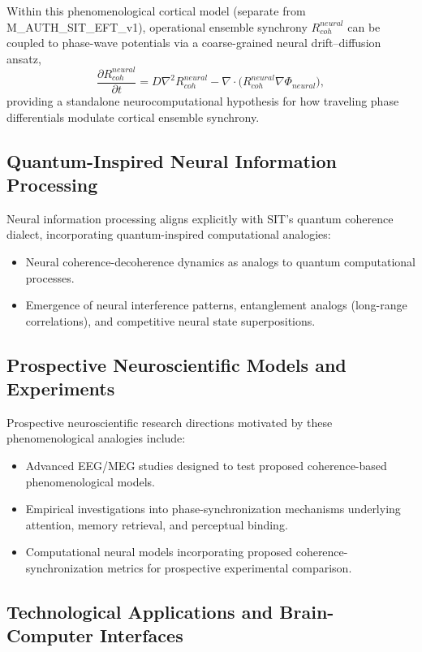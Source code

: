\documentclass[american,11pt,letterpaper]{article}
\def\mathrm#1{#1}%
\def\texttt#1{#1}%
\begin{document}
Within this phenomenological cortical model (separate from \texttt{M\_AUTH\_SIT\_EFT\_v1}), operational ensemble synchrony $R_{\mathrm{coh}}^{\mathrm{neural}}$ can be coupled to phase-wave potentials via a coarse-grained neural drift--diffusion ansatz,
\[
\frac{\partial R_{\mathrm{coh}}^{\mathrm{neural}}}{\partial t} = D \nabla^2 R_{\mathrm{coh}}^{\mathrm{neural}} - \nabla \cdot \bigl(R_{\mathrm{coh}}^{\mathrm{neural}} \nabla \Phi_{\mathrm{neural}}\bigr),
\]
providing a standalone neurocomputational hypothesis for how traveling phase differentials modulate cortical ensemble synchrony.

\subsection{Quantum-Inspired Neural Information Processing}

Neural information processing aligns explicitly with SIT's quantum coherence dialect, incorporating quantum-inspired computational analogies:

\begin{itemize}
\item Neural coherence-decoherence dynamics as analogs to quantum computational processes.
\item Emergence of neural interference patterns, entanglement analogs (long-range correlations), and competitive neural state superpositions.
\end{itemize}

\subsection{Prospective Neuroscientific Models and Experiments}

Prospective neuroscientific research directions motivated by these phenomenological analogies include:

\begin{itemize}
\item Advanced EEG/MEG studies designed to test proposed coherence-based phenomenological models.
\item Empirical investigations into phase-synchronization mechanisms underlying attention, memory retrieval, and perceptual binding.
\item Computational neural models incorporating proposed coherence-synchronization metrics for prospective experimental comparison.
\end{itemize}

\subsection{Technological Applications and Brain-Computer Interfaces}
\end{document}
